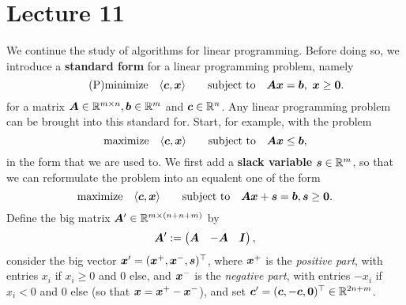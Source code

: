 %
%
% 


\chapter*{Lecture 11}
\setcounter{chapter}{1}
\setcounter{section}{0}
\setcounter{equation}{0}
\setcounter{theorem}{0}


We continue the study of algorithms for linear programming. Before doing so, we introduce a \textbf{standard form} for a linear programming problem, namely
\begin{equation}\label{eq:standard}\tag{P}
 \minimize \ip{\vct{c}}{\vct{x}} \quad \subjto \mtx{A}\vct{x}=\vct{b}, \ \vct{x}\geq \zerovct.
\end{equation}
for a matrix $\bm{A}\in \mathbb{R}^{m\times n}, \bm{b}\in \mathbb{R}^m$ and $\bm{c}\in \mathbb{R}^n$.
Any linear programming problem can be brought into this standard for. Start, for example, with
the problem
\begin{equation}\label{eq:old}
 \text{maximize}\quad \langle {\bm{c}}, {\bm{x}} \rangle \quad \quad\text{subject to}\quad \bm{A}\bm{x}\leq \bm{b},
\end{equation}
in the form that we are used to. We first add a \textbf{slack variable} $\bm{s}\in \mathbb{R}^m$, so that we can reformulate the problem into an equalent one of the form
\begin{equation}\label{eq:old}
 \text{maximize}\quad \langle {\bm{c}}, {\bm{x}} \rangle \quad \quad\text{subject to}\quad \bm{A}\bm{x}+\bm{s} = \bm{b}, \bm{s}\geq \bm{0}.
\end{equation}
Define the big matrix $\bm{A}'\in \mathbb{R}^{m\times (n+n+m)}$ by
\begin{equation*}
 \bm{A}' := \begin{pmatrix} \bm{A} & - \bm{A} & \bm{I} \end{pmatrix}, 
\end{equation*}
consider the big vector $\bm{x}' = (\bm{x}^+,\bm{x}^-,\bm{s})^{\top}$, where $\bm{x}^+$ is the {\em positive part}, with entries $x_i$ if $x_i\geq 0$ and $0$ else, and $\bm{x}^-$ is the {\em negative part}, with entries $-x_i$ if $x_i<0$ and $0$ else (so that $\bm{x}=\bm{x}^+-\bm{x}^-$), and set $\bm{c}'= (\bm{c},-\bm{c},\bm{0})^{\top}\in \mathbb{R}^{2n+m}$.

